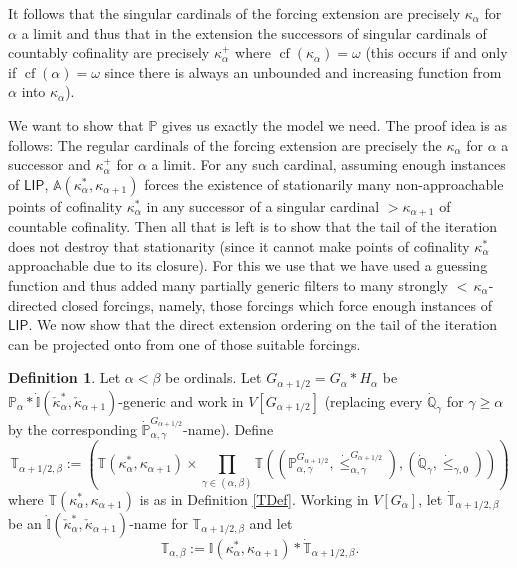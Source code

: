 \documentclass[a4paper]{amsart}
\theoremstyle{definition}
\newtheorem{mydef}{Definition}[section]
\theoremstyle{remark}
\theoremstyle{plain}
\numberwithin{mydef}{section}
\DeclareMathOperator{\cf}{cf}
\newcommand{\dA}{\mathbb{A}}
\newcommand{\dI}{\mathbb{I}}
\newcommand{\dP}{\mathbb{P}}
\newcommand{\dQ}{\mathbb{Q}}
\newcommand{\dT}{\mathbb{T}}
\newcommand{\LIP}{\mathsf{LIP}}
\begin{document}
	It follows that the singular cardinals of the forcing extension are precisely $\kappa_{\alpha}$ for $\alpha$ a limit and thus that in the extension the successors of singular cardinals of countably cofinality are precisely $\kappa_{\alpha}^+$ where $\cf(\kappa_{\alpha})=\omega$ (this occurs if and only if $\cf(\alpha)=\omega$ since there is always an unbounded and increasing function from $\alpha$ into $\kappa_{\alpha}$).
	
	We want to show that $\dP$ gives us exactly the model we need. The proof idea is as follows: The regular cardinals of the forcing extension are precisely the $\kappa_{\alpha}$ for $\alpha$ a successor and $\kappa_{\alpha}^+$ for $\alpha$ a limit. For any such cardinal, assuming enough instances of $\LIP$, $\dA(\kappa_{\alpha}^*,\kappa_{\alpha+1})$ forces the existence of stationarily many non-approachable points of cofinality $\kappa_{\alpha}^*$ in any successor of a singular cardinal $>\kappa_{\alpha+1}$ of countable cofinality. Then all that is left is to show that the tail of the iteration does not destroy that stationarity (since it cannot make points of cofinality $\kappa_{\alpha}^*$ approachable due to its closure). For this we use that we have used a guessing function and thus added many partially generic filters to many strongly ${<}\,\kappa_{\alpha}$-directed closed forcings, namely, those forcings which force enough instances of $\LIP$. We now show that the direct extension ordering on the tail of the iteration can be projected onto from one of those suitable forcings.
	
	\begin{mydef}
		Let $\alpha<\beta$ be ordinals. Let $G_{\alpha+1/2}=G_{\alpha}*H_{\alpha}$ be $\dP_{\alpha}*\dot{\dI}(\check{\kappa}_{\alpha}^*,\check{\kappa}_{\alpha+1})$-generic and work in $V[G_{\alpha+1/2}]$ (replacing every $\dot{\dQ}_{\gamma}$ for $\gamma\geq\alpha$ by the corresponding $\dot{\dP}_{\alpha,\gamma}^{G_{\alpha+1/2}}$-name). Define
		$$\dT_{\alpha+1/2,\beta}:=\left(\dT(\kappa_{\alpha}^*,\kappa_{\alpha+1})\times\prod_{\gamma\in(\alpha,\beta)}\dT((\dP_{\alpha,\gamma}^{G_{\alpha+1/2}},\dot{\leq}_{\alpha,\gamma}^{G_{\alpha+1/2}}),(\dot{\dQ}_{\gamma},\dot{\leq}_{\gamma,0}))\right)$$
		where $\dT(\kappa_{\alpha}^*,\kappa_{\alpha+1})$ is as in Definition \ref{TDef}.
		Working in $V[G_{\alpha}]$, let $\dot{\dT}_{\alpha+1/2,\beta}$ be an $\dot{\dI}(\check{\kappa}_{\alpha}^*,\check{\kappa}_{\alpha+1})$-name for $\dT_{\alpha+1/2,\beta}$ and let
		$$\dT_{\alpha,\beta}:=\dI(\kappa_{\alpha}^*,\kappa_{\alpha+1})*\dot{\dT}_{\alpha+1/2,\beta}.$$
	\end{mydef}
	
\end{document}
